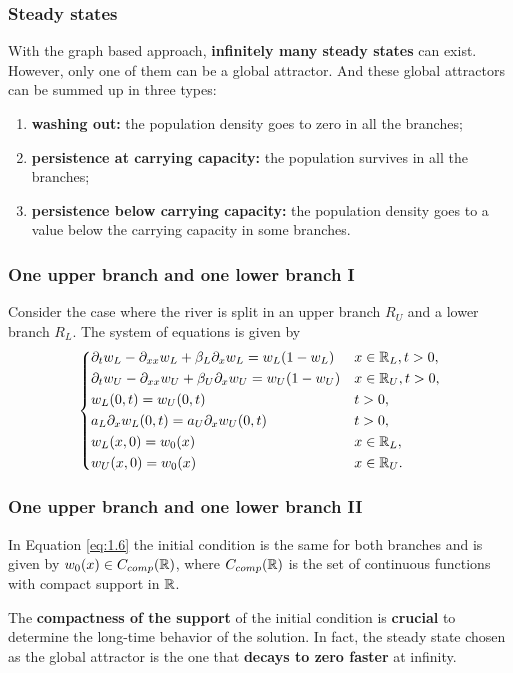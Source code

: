 \begin{frame}
    \frametitle{Steady states}
    With the graph based approach, \textbf{infinitely many steady states }can exist. However, only one of them can be a global attractor. And these global attractors can be summed up in three types:
    \begin{enumerate}
        \item \textbf{washing out:} the population density goes to zero in all the branches;
        \item \textbf{persistence at carrying capacity:} the population survives in all the branches;
        \item \textbf{persistence below carrying capacity:} the population density goes to a value below the carrying capacity in some branches.
    \end{enumerate}
\end{frame}


\begin{frame}
    \frametitle{One upper branch and one lower branch I}
    Consider the case where the river is split in an upper branch \(R_U\) and a lower branch \(R_L\). The system of equations is given by
    \begin{equation}
        \begin{dcases}
            \partial_t w_L - \partial_{xx}w_L + \beta_L \partial_x w_L = w_L(1 - w_L) &  x \in \mathbb{R}_L, t > 0, \\
            \partial_t w_U - \partial_{xx}w_U + \beta_U \partial_x w_U = w_U(1 - w_U) & x \in \mathbb{R}_U, t > 0, \\
            w_L(0, t) = w_U(0, t) &  t > 0, \\
            a_L \partial_x w_L(0, t) = a_U \partial_x w_U(0, t) &  t > 0, \\
            w_L(x, 0) = w_{0}(x) &  x \in \mathbb{R}_L, \\
            w_U(x, 0) = w_{0}(x) &  x \in \mathbb{R}_U.
        \end{dcases}
        \label{eq:1.6}
    \end{equation}
\end{frame}


\begin{frame}
    \frametitle{One upper branch and one lower branch II}
    In Equation \eqref{eq:1.6} the initial condition is the same for both branches and is given by \(w_0(x) \in C_{comp}(\mathbb{R})\), where \(C_{comp}(\mathbb{R})\) is the set of continuous functions with compact support in \(\mathbb{R}\).

    The \textbf{compactness of the support} of the initial condition is \textbf{crucial} to determine the long-time behavior of the solution. In fact, the steady state chosen as the global attractor is the one that \textbf{decays to zero faster} at infinity.
\end{frame}

